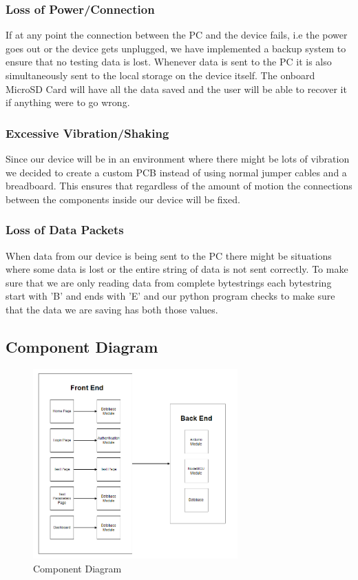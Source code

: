 \documentclass[12pt, titlepage]{article}
\begin{document}
\subsubsection{Loss of Power/Connection}
If at any point the connection between the PC and the device fails, i.e the power goes out or the device gets unplugged, we have implemented a backup system to ensure that no testing data is lost. Whenever data is sent to the PC it is also simultaneously sent to the local storage on the device itself. The onboard MicroSD Card will have all the data saved and the user will be able to recover it if anything were to go wrong.

\subsubsection{Excessive Vibration/Shaking}
Since our device will be in an environment where there might be lots of vibration we decided to create a custom PCB instead of using normal jumper cables and a breadboard. This ensures that regardless of the amount of motion the connections between the components inside our device will be fixed.

\subsubsection{Loss of Data Packets}
When data from our device is being sent to the PC there might be situations where some data is lost or the entire string of data is not sent correctly. To make sure that we are only reading data from complete bytestrings each bytestring start with 'B' and ends with 'E' and our python program checks to make sure that the data we are saving has both those values.


\newpage
\subsection{Component Diagram}
\begin{figure}[hbt!]
  \begin{center}
  \includegraphics[width=0.7\textwidth]{component_diagram.png}
  \caption{Component Diagram} 
  \end{center}
  \end{figure}
\end{document}
